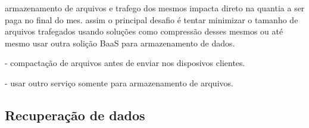 	armazenamento de arquivos e trafego dos mesmos impacta direto na quantia a ser paga no final do mes. assim o principal desafio é tentar minimizar o tamanho de arquivos trafegados usando soluções como compressão desses mesmos ou até mesmo usar outra solição BaaS para armazenamento de dados.

	- compactação de arquivos antes de enviar nos disposivos clientes.

	- usar outro serviço somente para armazenamento de arquivos.

	\subsection{Recuperação de dados}%

	
